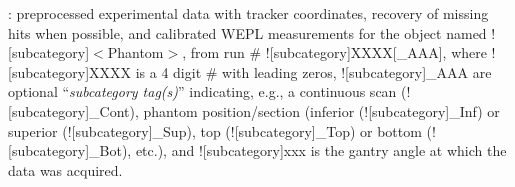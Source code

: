 \begin{tcbenvironment}
\begin{tcbenumbox}
\begin{ThinEnum}[labelindent=1pt, leftmargin=*]
\begin{ThinEnum}[labelindent=1pt, leftmargin=*]
\begin{ThinEnum}[labelindent=1pt, leftmargin=*]
            \item {} : preprocessed experimental data with tracker coordinates, recovery of missing hits when possible, and calibrated WEPL measurements for the object named \docentry![subcategory]{$<$Phantom$>$}, from run \# \docentry![subcategory]{XXXX[\_AAA]}, where \docentry![subcategory]{XXXX} is a 4 digit \# with leading zeros, \docentry![subcategory]{\_AAA} are optional ``\emph{subcategory tag(s)}'' indicating, e.g., a continuous scan (\docentry![subcategory]{\_Cont}), phantom position/section (inferior (\docentry![subcategory]{\_Inf}) or superior (\docentry![subcategory]{\_Sup}), top (\docentry![subcategory]{\_Top}) or bottom (\docentry![subcategory]{\_Bot}), etc.), and \docentry![subcategory]{xxx} is the gantry angle at which the data was acquired.
            \end{ThinEnum}
        \end{ThinEnum}
    \end{ThinEnum}
\end{tcbenumbox}
\end{tcbenvironment}
\endinput
